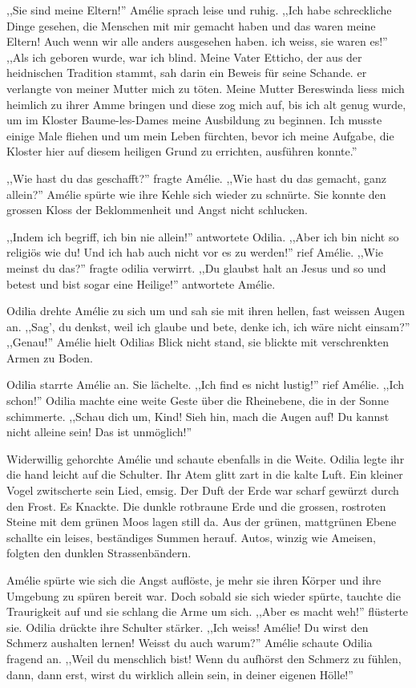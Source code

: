 ,,Sie sind meine Eltern!'' Amélie sprach leise und ruhig. ,,Ich habe schreckliche Dinge gesehen, die Menschen mit mir gemacht haben und das waren meine Eltern! Auch wenn wir alle anders ausgesehen haben. ich weiss, sie waren es!'' ,,Als ich geboren wurde, war ich blind. Meine Vater Etticho, der aus der heidnischen Tradition stammt, sah darin ein Beweis für seine Schande. er verlangte von meiner Mutter mich zu töten. Meine Mutter Bereswinda liess mich heimlich zu ihrer Amme bringen und diese zog mich auf, bis ich alt genug wurde, um im Kloster Baume-les-Dames meine Ausbildung zu beginnen. Ich musste einige Male fliehen und um mein Leben fürchten, bevor ich meine Aufgabe, die Kloster hier auf diesem heiligen Grund zu errichten, ausführen konnte.''

,,Wie hast du das geschafft?'' fragte Amélie. ,,Wie hast du das gemacht, ganz allein?'' Amélie spürte wie ihre Kehle sich wieder zu schnürte. Sie konnte den grossen Kloss der Beklommenheit und Angst nicht schlucken.

,,Indem ich begriff, ich bin nie allein!'' antwortete Odilia. ,,Aber ich bin nicht so religiös wie du! Und ich hab auch nicht vor es zu werden!'' rief Amélie. ,,Wie meinst du das?'' fragte odilia verwirrt. ,,Du glaubst halt an Jesus und so und betest und bist sogar eine Heilige!'' antwortete Amélie.

Odilia drehte Amélie zu sich um und sah sie mit ihren hellen, fast weissen Augen an. ,,Sag', du denkst, weil ich glaube und bete, denke ich, ich wäre nicht einsam?'' ,,Genau!'' Amélie hielt Odilias Blick nicht stand, sie blickte mit verschrenkten Armen zu Boden.

Odilia starrte Amélie an. Sie lächelte. ,,Ich find es nicht lustig!'' rief Amélie. ,,Ich schon!'' Odilia machte eine weite Geste über die Rheinebene, die in der Sonne schimmerte. ,,Schau dich um, Kind! Sieh hin, mach die Augen auf! Du kannst nicht alleine sein! Das ist unmöglich!''

Widerwillig gehorchte Amélie und schaute ebenfalls in die Weite. Odilia legte ihr die hand leicht auf die Schulter. Ihr Atem glitt zart in die kalte Luft. Ein kleiner Vogel zwitscherte sein Lied, emsig. Der Duft der Erde war scharf gewürzt durch den Frost. Es Knackte. Die dunkle rotbraune Erde und die grossen, rostroten Steine mit dem grünen Moos lagen still da. Aus der grünen, mattgrünen Ebene schallte ein leises, beständiges Summen herauf. Autos, winzig wie Ameisen, folgten den dunklen Strassenbändern.

Amélie spürte wie sich die Angst auflöste, je mehr sie ihren Körper und ihre Umgebung zu spüren bereit war. Doch sobald sie sich wieder spürte, tauchte die Traurigkeit auf und sie schlang die Arme um sich. ,,Aber es macht weh!'' flüsterte sie. Odilia drückte ihre Schulter stärker. ,,Ich weiss! Amélie! Du wirst den Schmerz aushalten lernen! Weisst du auch warum?'' Amélie schaute Odilia fragend an. ,,Weil du menschlich bist! Wenn du aufhörst den Schmerz zu fühlen, dann, dann erst, wirst du wirklich allein sein, in deiner eigenen Hölle!''

